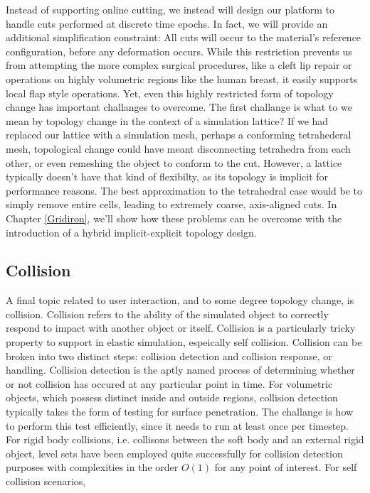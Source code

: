 \documentclass[12pt,oneside,letterpaper]{memoir}
\begin{document}
  Instead of supporting online cutting, we instead will design our
  platform to handle cuts performed at discrete time epochs. In fact,
  we will provide an additional simplification constraint: All cuts
  will occur to the material's reference configuration, before any
  deformation occurs. While this restriction prevents us from
  attempting the more complex surgical procedures, like a cleft lip
  repair or operations on highly volumetric regions like the human
  breast, it easily supports local flap style operations. Yet, even this
  highly restricted form of topology change has important challanges
  to overcome. The first challange is what to we mean by topology
  change in the context of a simulation lattice? If we had replaced
  our lattice with a simulation mesh, perhaps a conforming
  tetrahederal mesh, topological change could have meant disconnecting
  tetrahedra from each other, or even remeshing the object to conform
  to the cut. However, a lattice typically doesn't have that kind of
  flexibilty, as its topology is implicit for performance reasons. The
  best approximation to the tetrahedral case would be to simply remove
  entire cells, leading to extremely coarse, axis-aligned cuts. In
  Chapter \ref{Gridiron}, we'll show how these problems can be
  overcome with the introduction of a hybrid implicit-explicit
  topology design.

  \subsection{Collision}

  A final topic related to user interaction, and to some degree
  topology change, is collision. Collision refers to the ability of
  the simulated object to correctly respond to impact with another
  object or itself. Collision is a particularly tricky property to
  support in elastic simulation, espeically self collision. Collision
  can be broken into two distinct steps: collision detection and
  collision response, or handling. Collision detection is the aptly
  named process of determining whether or not collision has occured at
  any particular point in time. For volumetric objects, which possess
  distinct inside and outside regions, collision detection typically
  takes the form of testing for surface penetration. The challange is
  how to perform this test efficiently, since it needs to run at least
  once per timestep. For rigid body collisions, i.e. collisons between
  the soft body and an external rigid object, level sets have been
  employed quite successfully for collision detection purposes with
  complexities in the order $O(1)$ for any point of
  interest. For self collision scenarios, 
  
\end{document}

